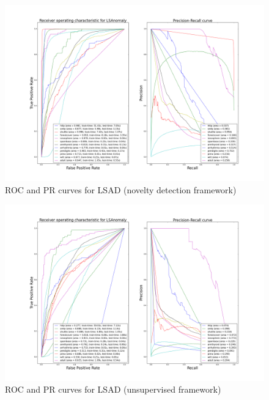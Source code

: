 \begin{figure}[!ht]
  \caption{ROC and PR curves for LSAD (novelty detection framework)}
  \label{ocrf:fig:LSAnomaly_roc_pr}
  \centering
  \includegraphics[trim=175 80 175 123, clip, width=\linewidth]{fig_source/ocrf_fig/bench_LSAnomaly_roc_pr_supervised_factorized.png}
\end{figure}
\begin{figure}[!ht]
  \caption{ROC and PR curves for LSAD (unsupervised framework)}
  \label{ocrf:fig:LSAnomaly_roc_pr_unsupervised}
  \centering
  \includegraphics[trim=175 80 175 123, clip, width=\linewidth]{fig_source/ocrf_fig/bench_LSAnomaly_roc_pr_unsupervised_factorized.png}
\end{figure}

